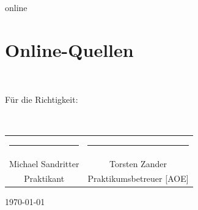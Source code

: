 \documentclass[11pt,a4paper]{article}
\begin{document}
%
\begin{btSect}{online}
\section*{Online-Quellen}
\btPrintCited
\end{btSect}

\newpage

\bigskip ~ \bigskip ~ \bigskip ~ \bigskip ~ \bigskip ~ \bigskip ~ \bigskip ~ \bigskip ~ \bigskip ~ \bigskip ~ \bigskip
\bigskip ~ \bigskip ~ \bigskip ~ \bigskip ~ \bigskip ~ \bigskip ~ \bigskip ~ \bigskip ~ \bigskip ~ \bigskip ~ \bigskip
\bigskip ~ \bigskip ~ \bigskip ~ \bigskip ~ \bigskip ~ \bigskip ~ \bigskip ~ \bigskip ~ \bigskip ~ \bigskip ~ \bigskip

Für die Richtigkeit:

\bigskip ~ \bigskip ~ \bigskip ~ \bigskip ~ \bigskip ~ \bigskip

\begin{center}
\begin{tabular}{ c c }
	\rule{0.47\textwidth}{0.4pt} & \rule{0.47\textwidth}{0.4pt} \\
 	Michael Sandritter & Torsten Zander \\
 	\footnotesize Praktikant & \footnotesize Praktikumsbetreuer [AOE] \\
\end{tabular}
\end{center}
 
\bigskip

\begin{center}
\today
\end{center}
\end{document}
